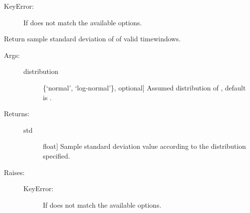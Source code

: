 \documentclass[letterpaper,10pt,english,openany,oneside]{sphinxmanual}
\begin{document}
\begin{fulllineitems}
\begin{fulllineitems}
\begin{description}
\begin{description}
\item[{KeyError:}] \leavevmode
If  does not match the available options.

\end{description}

\end{description}

\end{fulllineitems}


\begin{fulllineitems}
\label{\detokenize{index:hvsrpy.Hvsr.std_f0}}
Return sample standard deviation of  of valid
timewindows.
\begin{description}
\item[{Args:}] \leavevmode\begin{description}
\item[{distribution}] \leavevmode{[}\{‘normal’, ‘log-normal’\}, optional{]}
Assumed distribution of , default is .

\end{description}

\item[{Returns:}] \leavevmode\begin{description}
\item[{std}] \leavevmode{[}float{]}
Sample standard deviation value according to the
distribution specified.

\end{description}

\item[{Raises:}] \leavevmode\begin{description}
\item[{KeyError:}] \leavevmode
If  does not match the available options.

\end{description}

\end{description}

\end{fulllineitems}



\end{fulllineitems}
\end{document}
